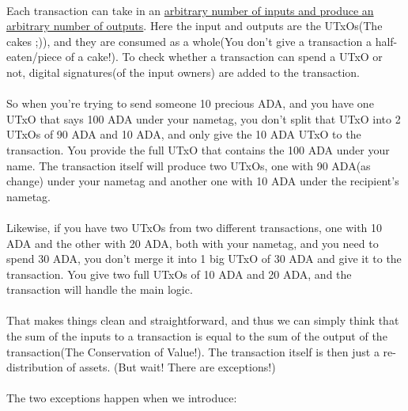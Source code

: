 \documentclass[a4paper, 11pt]{article}
\begin{document}
    \paragraph{} Each transaction can take in an \ul{arbitrary number of inputs and produce an arbitrary number of outputs}. Here the input and outputs are the UTxOs(The cakes ;)), and they are consumed as a whole(You don't give a transaction a half-eaten/piece of a cake!). To check whether a transaction can spend a UTxO or not, digital signatures(of the input owners) are added to the transaction. 
    
    \paragraph{}So when you're trying to send someone 10 precious ADA, and you have one UTxO that says 100 ADA under your nametag, you don't split that UTxO into 2 UTxOs of 90 ADA and 10 ADA, and only give the 10 ADA UTxO to the transaction. You provide the full UTxO that contains the 100 ADA under your name. The transaction itself will produce two UTxOs, one with 90 ADA(as change) under your nametag and another one with 10 ADA under the recipient's nametag.

    \paragraph{} Likewise, if you have two UTxOs from two different transactions, one with 10 ADA and the other with 20 ADA, both with your nametag, and you need to spend 30 ADA, you don't merge it into 1 big UTxO of 30 ADA and give it to the transaction. You give two full UTxOs of 10 ADA and 20 ADA, and the transaction will handle the main logic.

    \paragraph{} That makes things clean and straightforward, and thus we can simply think that the sum of the inputs to a transaction is equal to the sum of the output of the transaction(The Conservation of Value!).  The transaction itself is then just a re-distribution of assets. (But wait! There are exceptions!)

    \paragraph{} The two exceptions happen when we introduce: 
    
\end{document}
